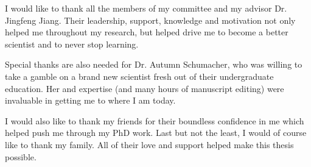 %

I would like to thank all the members of my committee and my advisor Dr. Jingfeng Jiang. Their leadership, support, knowledge and motivation not only helped me throughout my research, but helped drive me to become a better scientist and to never stop learning.

Special thanks are also needed for Dr. Autumn Schumacher, who was willing to take a gamble on a brand new scientist fresh out of their undergraduate education. Her  and expertise (and many hours of manuscript editing) were invaluable in getting me to where I am today.

I would also like to thank my friends for their boundless confidence in me which helped push me through my PhD work. Last but not the least, I would of course like to thank my family. All of their love and support helped make this thesis possible.